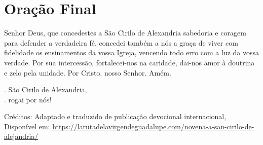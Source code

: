 \documentclass[18pt]{article}
\makeatletter
\newcommand{\vers@resp@sym}{%
  \raisebox{0.2ex}{\rotatebox[origin=c]{-20}{$\m@th\rceil$}}%
}
\newcommand{\vers@resp}[2]{%
  {\ooalign{%
     \hidewidth\kern#1\vers@resp@sym\hidewidth\cr
     #2\cr
  }}%
}
\DeclareRobustCommand{\versicle}{\vers@resp{-0.1em}{V}}
\DeclareRobustCommand{\response}{\vers@resp{0pt}{R}}
\makeatother
\begin{document}
\newpage

\section{Oração Final}
\label{sec:OraçãoFinal}
\begin{justify}
Senhor Deus, que concedestes a São Cirilo de Alexandria sabedoria e coragem para defender a verdadeira fé, concedei também a nós a graça de viver com fidelidade os ensinamentos da vossa Igreja, vencendo todo erro com a luz da vossa verdade. Por sua intercessão, fortalecei-nos na caridade, dai-nos amor à doutrina e zelo pela unidade. Por Cristo, nosso Senhor. Amém.

\vspace{0.5cm}

\noindent
\versicle. São Cirilo de Alexandria,\\
\response. rogai por nós!
\end{justify}

\vfill

Créditos: Adaptado e traduzido de publicação devocional internacional, Disponível em: \url{https://larutadelavirgendeguadalupe.com/novena-a-san-cirilo-de-alejandria/}
\end{document}
